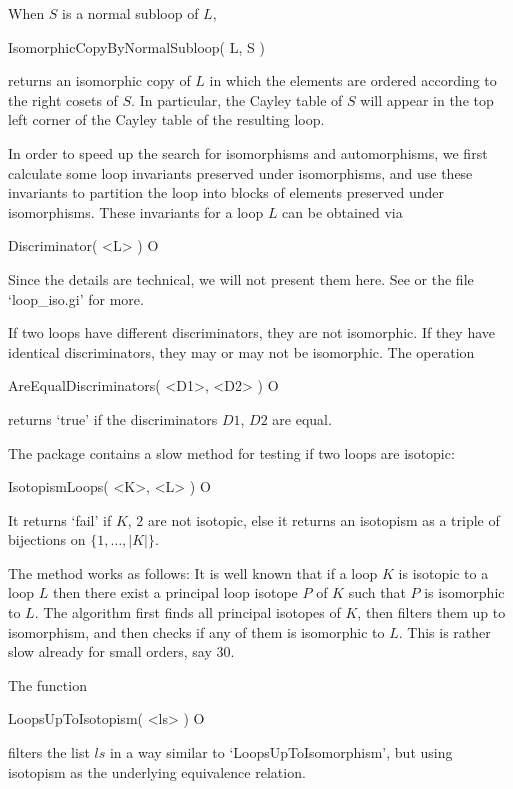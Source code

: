 When $S$ is a normal subloop of $L$,

\>IsomorphicCopyByNormalSubloop( L, S )

returns an isomorphic copy of $L$ in which the elements are ordered according
to the right cosets of $S$. In particular, the Cayley table of $S$ will appear
in the top left corner of the Cayley table of the resulting loop.


In order to speed up the search for isomorphisms and automorphisms, we first
calculate some loop invariants preserved under isomorphisms, and use these
invariants to partition the loop into blocks of elements preserved under
isomorphisms. These invariants for a loop $L$ can be obtained via

\>Discriminator( <L> ) O

Since the details are technical, we will not present them here. See
\cite{VoEJC} or the file `loop_iso.gi' for more.

If two loops have different discriminators, they are not isomorphic. If they
have identical discriminators, they may or may not be isomorphic. The operation

\>AreEqualDiscriminators( <D1>, <D2> ) O

returns `true' if the discriminators $D1$, $D2$ are equal.


The package contains a slow method for testing if two loops are isotopic:

\>IsotopismLoops( <K>, <L> ) O

It returns `fail' if $K$, $2$ are not isotopic, else it returns an isotopism as
a triple of bijections on $\{1,\dots,|K|\}$.

The method works as follows: It is well known that if a loop $K$ is isotopic to
a loop $L$ then there exist a principal loop isotope $P$ of $K$ such that $P$
is isomorphic to $L$. The algorithm first finds all principal isotopes of $K$,
then filters them up to isomorphism, and then checks if any of them is
isomorphic to $L$. This is rather slow already for small orders, say $30$.

The function

\>LoopsUpToIsotopism( <ls> ) O

filters the list $ls$ in a way similar to `LoopsUpToIsomorphism', but using
isotopism as the underlying equivalence relation.
